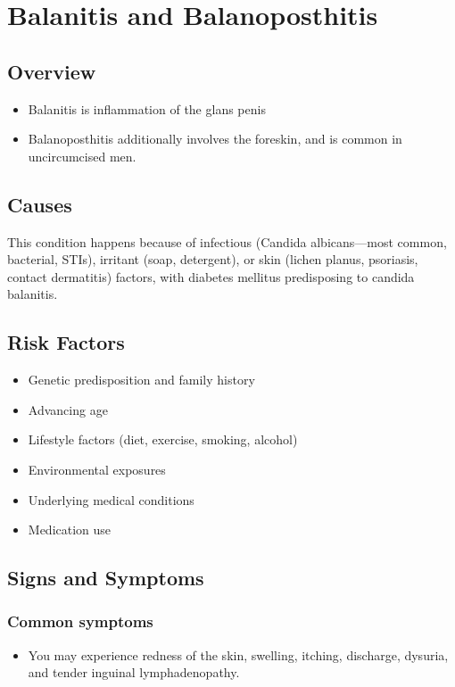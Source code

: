 \chapter{Balanitis and Balanoposthitis}
\label{sec:Balanitis and Balanoposthitis}

\section{Overview}


\begin{itemize}[noitemsep]
  \item Balanitis is inflammation of the glans penis
  \item Balanoposthitis additionally involves the foreskin, and is common in uncircumcised men.
\end{itemize}
\section{Causes}
This condition happens because of infectious (Candida albicans---most common, bacterial, STIs), irritant (soap, detergent), or skin (lichen planus, psoriasis, contact dermatitis) factors, with diabetes mellitus predisposing to candida balanitis.     
\section{Risk Factors}

\begin{itemize}[noitemsep]
  \item Genetic predisposition and family history
  \item Advancing age
  \item Lifestyle factors (diet, exercise, smoking, alcohol)
  \item Environmental exposures
  \item Underlying medical conditions
  \item Medication use
\end{itemize}
\section{Signs and Symptoms}

\subsection{Common symptoms}
\begin{itemize}[noitemsep]
  \item You may experience redness of the skin, swelling, itching, discharge, dysuria, and tender inguinal lymphadenopathy. 
  \end{itemize}

